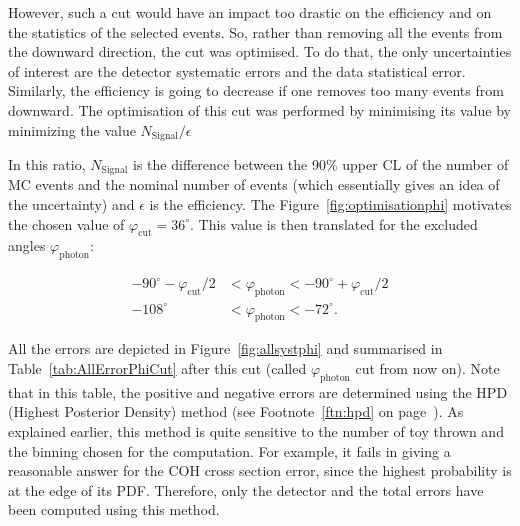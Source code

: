 However, such a cut would have an impact too drastic on the efficiency
and on the statistics of the selected events. So, rather than removing
all the events from the downward direction, the cut was optimised. To
do that, the only uncertainties of interest are the detector
systematic errors and the data statistical error. Similarly, the
efficiency is going to decrease if one removes too many events from
downward. The optimisation of this cut was performed by minimising its
value by minimizing the value $N_\text{Signal}/\epsilon$

In this ratio, $N_\text{Signal}$ is the difference between the 90\%
upper \Gls{CL} of the number of \Gls{MC} events and the nominal number
of events (which essentially gives an idea of the uncertainty) and
$\epsilon$ is the efficiency. The Figure~\ref{fig:optimisationphi}
motivates the chosen value of $\varphi_\text{cut} = 36^{\circ}$. This
value is then translated for the excluded angles
$\varphi_{\text{photon}}$:

\begin{align}
  -90^{\circ} - \varphi_{\text{cut}} / 2 &< \varphi_{\text{photon}} < -90^{\circ} + \varphi_{\text{cut}} / 2 \\
  -108^{\circ} & <  \varphi_{\text{photon}} < -72^{\circ}.
\end{align}

All the errors are depicted in Figure~\ref{fig:allsystphi} and
summarised in Table~\ref{tab:AllErrorPhiCut} after this cut (called
$\varphi_\text{photon}$ cut from now on). Note that in this table, the
positive and negative errors are determined using the \Gls{HPD}
(Highest Posterior Density) method (see Footnote~\ref{ftn:hpd} on
page~\pageref{ftn:hpd}). As explained earlier, this method is quite
sensitive to the number of toy thrown and the binning chosen for the
computation. For example, it fails in giving a reasonable answer for
the \Gls{COH} cross section error, since the highest probability is at
the edge of its \Gls{PDF}. Therefore, only the detector and the total
errors have been computed using this method.

